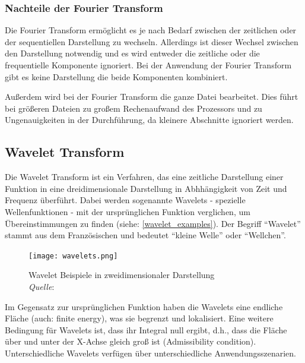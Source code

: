 %
\subsubsection{Nachteile der Fourier Transform}
\label{disadvantages_fourier}
%
    
Die Fourier Transform ermöglicht es je nach Bedarf zwischen der zeitlichen oder der sequentiellen Darstellung zu wechseln. Allerdings ist dieser Wechsel zwischen den Darstellung notwendig und es wird entweder die zeitliche oder die frequentielle Komponente ignoriert. Bei der Anwendung der Fourier Transform gibt es keine Darstellung die beide Komponenten kombiniert.

\par

Außerdem wird bei der Fourier Transform die ganze Datei bearbeitet. Dies führt bei größeren Dateien zu großem Rechenaufwand des Prozessors und zu Ungenauigkeiten in der Durchführung, da kleinere Abschnitte ignoriert werden.

%
\subsection{Wavelet Transform}
\label{wavelet-transformation}
%

Die Wavelet Transform ist ein Verfahren, das eine zeitliche Darstellung einer Funktion in eine dreidimensionale Darstellung in Abhhängigkeit von Zeit und Frequenz überführt. Dabei werden sogenannte Wavelets - spezielle Wellenfunktionen - mit der ursprünglichen Funktion verglichen, um Übereinstimmungen zu finden (siehe: \cref{wavelet_examples}). Der Begriff \enquote{Wavelet} stammt aus dem Französischen und bedeutet \enquote{kleine Welle} oder \enquote{Wellchen}.

%
\begin{figure}[h]
    \centering
    \texttt{[image: wavelets.png]}
    \caption[Wavelet Beispiele in zweidimensionaler Darstellung]{Wavelet Beispiele in zweidimensionaler Darstellung\\\hspace{\textwidth}\textit{Quelle}: \cite{wavelet_examples}}
    \label{fig:wavelet_examples}
\end{figure}
%

Im Gegensatz zur ursprünglichen Funktion haben die Wavelets eine endliche Fläche (auch: finite energy), was sie begrenzt und lokalisiert. Eine weitere Bedingung für Wavelets ist, dass ihr Integral null ergibt, d.h., dass die Fläche über und unter der X-Achse gleich groß ist (Admissibility condition). Unterschiedliche Wavelets verfügen über unterschiedliche Anwendungsszenarien.

